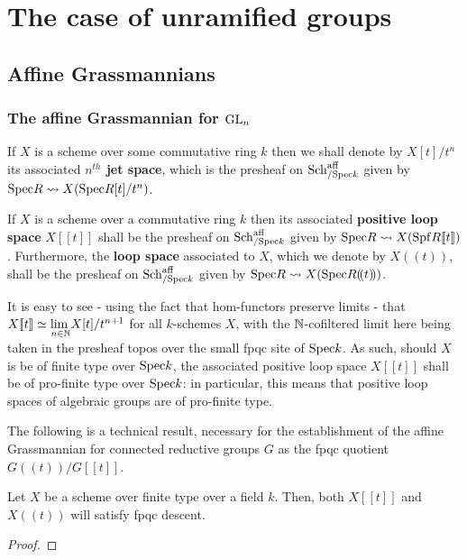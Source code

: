 \section{The case of unramified groups}
    \subsection{Affine Grassmannians}
        \subsubsection{The affine Grassmannian for \texorpdfstring{$\operatorname{GL}_n$}{}}
            \begin{definition} \label{def: jet_spaces}
                If $X$ is a scheme over some commutative ring $k$ then we shall denote by $X[t]/t^n$ its associated \textbf{$n^{th}$ jet space}, which is the presheaf on $\mathrm{Sch}_{/\mathrm{Spec} k}^{\mathrm{aff}}$ given by $\mathrm{Spec} R \leadsto X(\mathrm{Spec} R[t]/t^n)$.
            \end{definition}
            \begin{definition} \label{def: loop_spaces}
                If $X$ is a scheme over a commutative ring $k$ then its associated \textbf{positive loop space} $X[\![t]\!]$ shall be the presheaf on $\mathrm{Sch}_{/\mathrm{Spec} k}^{\mathrm{aff}}$ given by $\mathrm{Spec} R \leadsto X(\mathrm{Spf} R[\![t]\!])$. Furthermore, the \textbf{loop space} associated to $X$, which we denote by $X(\!(t)\!)$, shall be the presheaf on $\mathrm{Sch}_{/\mathrm{Spec} k}^{\mathrm{aff}}$ given by $\mathrm{Spec} R \leadsto X(\mathrm{Spec} R(\!(t)\!))$.
            \end{definition}
            \begin{remark}
                It is easy to see - using the fact that hom-functors preserve limits - that $X[\![t]\!] \simeq \underset{n \in \mathbb{N}}{\operatorname{lim} \:} X[t]/t^{n + 1}$ for all $k$-schemes $X$, with the $\mathbb{N}$-cofiltered limit here being taken in the presheaf topos over the small fpqc site of $\mathrm{Spec} k$. As such, should $X$ is be of finite type over $\mathrm{Spec} k$, the associated positive loop space $X[\![t]\!]$ shall be of pro-finite type over $\mathrm{Spec} k$: in particular, this means that positive loop spaces of algebraic groups are of pro-finite type.
            \end{remark}
            The following is a technical result, necessary for the establishment of the affine Grassmannian for connected reductive groups $G$ as the fpqc quotient $G(\!(t)\!)/G[\![t]\!]$.
            \begin{proposition} \label{prop: loop_spaces_are_fpqc_sheaves}
                Let $X$ be a scheme over finite type over a field $k$. Then, both $X[\![t]\!]$ and $X(\!(t)\!)$ will satisfy fpqc descent. 
            \end{proposition}
                \begin{proof}
                        
                \end{proof}
            
